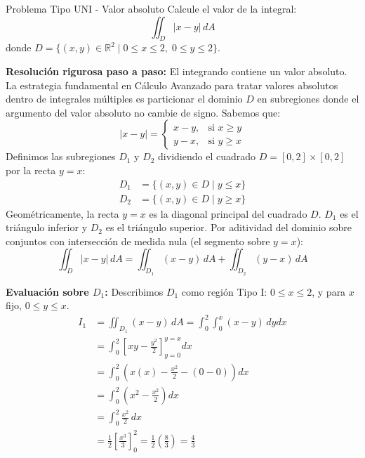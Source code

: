 \documentclass[11pt,a4paper]{article}
\begin{document}
\begin{ejerciciobox}{Problema Tipo UNI - Valor absoluto}{}
    Calcule el valor de la integral:
    \[
    \iint_D |x - y| \, dA
    \]
    donde $D = \{ (x,y) \in \mathbb{R}^2 \mid 0 \leq x \leq 2, \; 0 \leq y \leq 2 \}$.
\end{ejerciciobox}

\textbf{Resolución rigurosa paso a paso:}
El integrando contiene un valor absoluto. La estrategia fundamental en Cálculo Avanzado para tratar valores absolutos dentro de integrales múltiples es particionar el dominio $D$ en subregiones donde el argumento del valor absoluto no cambie de signo.
Sabemos que:
\[
|x - y| = \begin{cases} 
x - y, & \text{si } x \geq y \\
y - x, & \text{si } y \geq x 
\end{cases}
\]
Definimos las subregiones $D_1$ y $D_2$ dividiendo el cuadrado $D = [0,2] \times [0,2]$ por la recta $y=x$:
\begin{align*}
D_1 &= \{ (x,y) \in D \mid y \leq x \} \\
D_2 &= \{ (x,y) \in D \mid y \geq x \}
\end{align*}
Geométricamente, la recta $y=x$ es la diagonal principal del cuadrado $D$. $D_1$ es el triángulo inferior y $D_2$ es el triángulo superior. Por aditividad del dominio sobre conjuntos con intersección de medida nula (el segmento sobre $y=x$):
\[
\iint_D |x - y| \, dA = \iint_{D_1} (x - y) \, dA + \iint_{D_2} (y - x) \, dA
\]

\textbf{Evaluación sobre $D_1$:}
Describimos $D_1$ como región Tipo I: $0 \leq x \leq 2$, y para $x$ fijo, $0 \leq y \leq x$.
\begin{align*}
I_1 &= \iint_{D_1} (x - y) \, dA = \int_0^2 \int_0^x (x - y) \, dy dx \\
    &= \int_0^2 \left[ xy - \frac{y^2}{2} \right]_{y=0}^{y=x} dx \\
    &= \int_0^2 \left( x(x) - \frac{x^2}{2} - (0 - 0) \right) dx \\
    &= \int_0^2 \left( x^2 - \frac{x^2}{2} \right) dx \\
    &= \int_0^2 \frac{x^2}{2} \, dx \\
    &= \frac{1}{2} \left[ \frac{x^3}{3} \right]_0^2 = \frac{1}{2} \left( \frac{8}{3} \right) = \frac{4}{3}
\end{align*}
\end{document}
